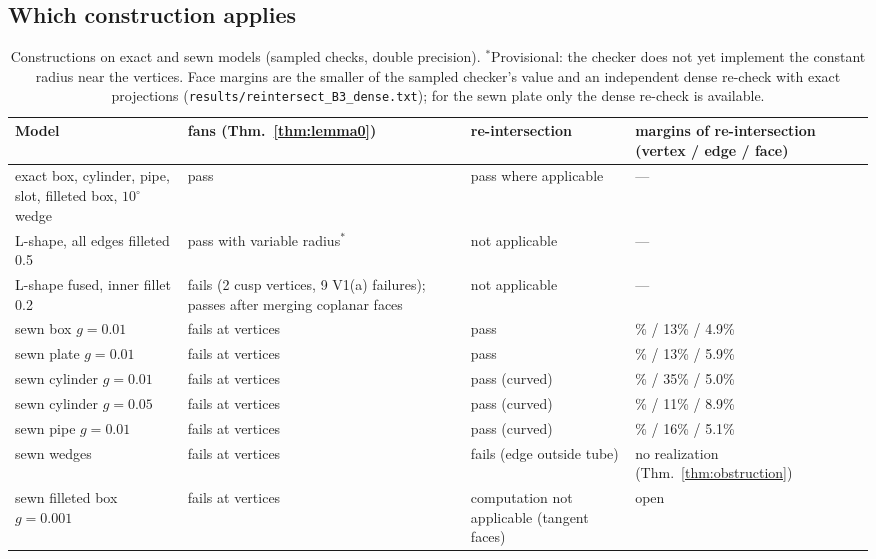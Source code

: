\documentclass[preprint,12pt]{elsarticle}
\theoremstyle{definition}
\theoremstyle{remark}
\begin{document}
\subsection{Which construction applies}

\begin{table}[h]
\centering\small
\begin{tabular}{>{\raggedright}p{4.0cm}>{\raggedright}p{2.8cm}>{\raggedright}p{2.6cm}>{\raggedright\arraybackslash}p{4.0cm}}
\toprule
Model & fans (Thm.~\ref{thm:lemma0}) & re-intersection & margins of re-intersection (vertex / edge / face) \\
\midrule
exact box, cylinder, pipe, slot, filleted box, $10^\circ$ wedge & pass & pass where applicable & --- \\
L-shape, all edges filleted 0.5 & pass with variable radius$^*$ & not applicable & --- \\
L-shape fused, inner fillet 0.2 & fails (2 cusp vertices, 9 V1(a) failures); passes after merging coplanar
faces & not applicable & --- \\
sewn box $g=0.01$ & fails at vertices & pass & 45\% / 13\% / 4.9\% \\
sewn plate $g=0.01$ & fails at vertices & pass & 45\% / 13\% / 5.9\% \\
sewn cylinder $g=0.01$ & fails at vertices & pass (curved) & 55\% / 35\% / 5.0\% \\
sewn cylinder $g=0.05$ & fails at vertices & pass (curved) & 55\% / 11\% / 8.9\% \\
sewn pipe $g=0.01$ & fails at vertices & pass (curved) & 53\% / 16\% / 5.1\% \\
sewn wedges & fails at vertices & fails (edge outside tube) & no realization (Thm.~\ref{thm:obstruction}) \\
sewn filleted box $g=0.001$ & fails at vertices & computation not applicable (tangent faces) & open \\
\bottomrule
\end{tabular}
\caption{Constructions on exact and sewn models (sampled checks, double precision). $^*$Provisional: the checker
does not yet implement the constant radius near the vertices. Face margins are the smaller of the sampled checker's
value and an independent dense re-check with exact projections (\texttt{results/reintersect\_B3\_dense.txt}); for the
sewn plate only the dense re-check is available.}\label{tab:constr}
\end{table}
\end{document}
